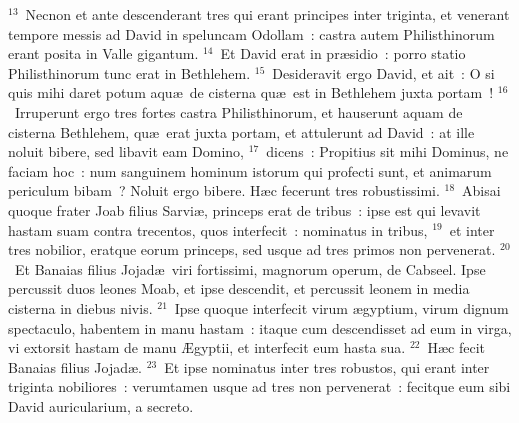 ${}^{13}$~Necnon et ante descenderant tres qui erant principes inter triginta, et venerant tempore messis ad David in speluncam Odollam~: castra autem Philisthinorum erant posita in Valle gigantum.
${}^{14}$~Et David erat in pr\ae sidio~: porro statio Philisthinorum tunc erat in Bethlehem.
${}^{15}$~Desideravit ergo David, et ait~: O si quis mihi daret potum aqu\ae\ de cisterna qu\ae\ est in Bethlehem juxta portam~!
${}^{16}$~Irruperunt ergo tres fortes castra Philisthinorum, et hauserunt aquam de cisterna Bethlehem, qu\ae\ erat juxta portam, et attulerunt ad David~: at ille noluit bibere, sed libavit eam Domino,
${}^{17}$~dicens~: Propitius sit mihi Dominus, ne faciam hoc~: num sanguinem hominum istorum qui profecti sunt, et animarum periculum bibam~? Noluit ergo bibere. H\ae c fecerunt tres robustissimi.
${}^{18}$~Abisai quoque frater Joab filius Sarvi\ae , princeps erat de tribus~: ipse est qui levavit hastam suam contra trecentos, quos interfecit~: nominatus in tribus,
${}^{19}$~et inter tres nobilior, eratque eorum princeps, sed usque ad tres primos non pervenerat.
${}^{20}$~Et Banaias filius Jojad\ae\ viri fortissimi, magnorum operum, de Cabseel. Ipse percussit duos leones Moab, et ipse descendit, et percussit leonem in media cisterna in diebus nivis.
${}^{21}$~Ipse quoque interfecit virum \ae gyptium, virum dignum spectaculo, habentem in manu hastam~: itaque cum descendisset ad eum in virga, vi extorsit hastam de manu \AE gyptii, et interfecit eum hasta sua.
${}^{22}$~H\ae c fecit Banaias filius Jojad\ae .
${}^{23}$~Et ipse nominatus inter tres robustos, qui erant inter triginta nobiliores~: verumtamen usque ad tres non pervenerat~: fecitque eum sibi David auricularium, a secreto.


